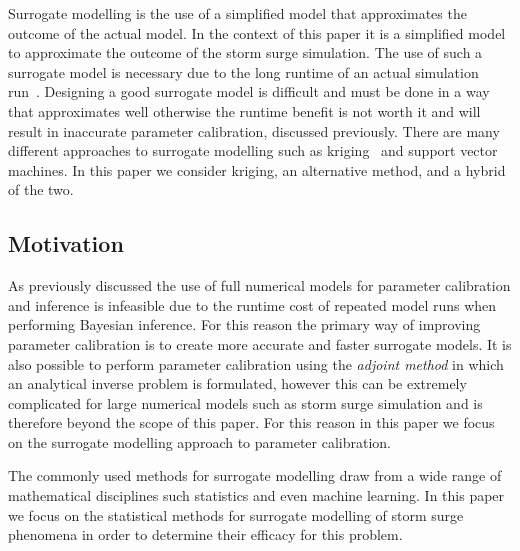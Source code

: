 \documentclass[12pt,a4paper]{article}
\begin{document}
Surrogate modelling is the use of a simplified model that approximates the outcome of the actual model. In the context of this paper it is a simplified model to approximate the outcome of the storm surge simulation. The use of such a surrogate model is necessary due to the long runtime of an actual simulation run~\cite{tsunami}. Designing a good surrogate model is difficult and must be done in a way that approximates well otherwise the runtime benefit is not worth it and will result in inaccurate parameter calibration, discussed previously. There are many different approaches to surrogate modelling such as kriging~\cite{krigingintro} and support vector machines. In this paper we consider kriging, an alternative method, and a hybrid of the two.

\subsection{Motivation}
\noindent
As previously discussed the use of full numerical models for parameter calibration and inference is infeasible due to the runtime cost of repeated model runs when performing Bayesian inference. For this reason the primary way of improving parameter calibration is to create more accurate and faster surrogate models. It is also possible to perform parameter calibration using the \textit{adjoint method} in which an analytical inverse problem is formulated, however this can be extremely complicated for large numerical models such as storm surge simulation and is therefore beyond the scope of this paper. For this reason in this paper we focus on the surrogate modelling approach to parameter calibration.

The commonly used methods for surrogate modelling draw from a wide range of mathematical disciplines such statistics and even machine learning. In this paper we focus on the statistical methods for surrogate modelling of storm surge phenomena in order to determine their efficacy for this problem.
\end{document}
